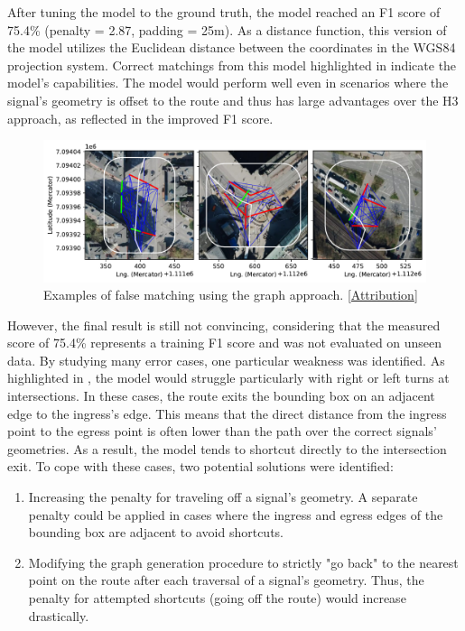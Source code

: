 After tuning the model to the ground truth, the model reached an F1 score of 75.4\% (penalty = 2.87, padding = 25m). As a distance function, this version of the model utilizes the Euclidean distance between the coordinates in the WGS84 projection system. Correct matchings from this model highlighted in  indicate the model's capabilities. The model would perform well even in scenarios where the signal's geometry is offset to the route and thus has large advantages over the H3 approach, as reflected in the improved F1 score.

\begin{figure}[htbp]
\centering
\includegraphics[width=\linewidth]{images/matching-dijkstra-incorrect.pdf}
\caption{Examples of false matching using the graph approach. [\hyperref[attribution]{Attribution}]}
\label{fig:sg-selection-graph-fails}
\end{figure}

However, the final result is still not convincing, considering that the measured score of 75.4\% represents a training F1 score and was not evaluated on unseen data. By studying many error cases, one particular weakness was identified. As highlighted in , the model would struggle particularly with right or left turns at intersections. In these cases, the route exits the bounding box on an adjacent edge to the ingress's edge. This means that the direct distance from the ingress point to the egress point is often lower than the path over the correct signals' geometries. As a result, the model tends to shortcut directly to the intersection exit. To cope with these cases, two potential solutions were identified:

\begin{enumerate}
    \item Increasing the penalty for traveling off a signal's geometry. A separate penalty could be applied in cases where the ingress and egress edges of the bounding box are adjacent to avoid shortcuts.
    \item  Modifying the graph generation procedure to strictly "go back" to the nearest point on the route after each traversal of a signal's geometry. Thus, the penalty for attempted shortcuts (going off the route) would increase drastically.
\end{enumerate}

